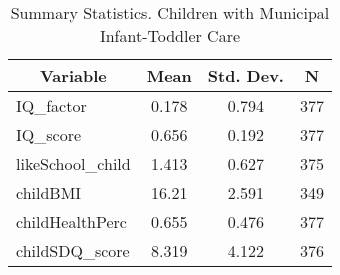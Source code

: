 
\begin{table}[htbp]\centering \caption{Summary Statistics. Children with Municipal Infant-Toddler Care \label{schoolChildasiloMuni}}
\begin{tabular}{l c c  c}\hline\hline
\multicolumn{1}{c}{\textbf{Variable}} & \textbf{Mean}
 & \textbf{Std. Dev.} & \textbf{N}\\ \hline
IQ\_factor & 0.178 & 0.794  & 377\\
IQ\_score & 0.656 & 0.192  & 377\\
likeSchool\_child & 1.413 & 0.627  & 375\\
childBMI & 16.21 & 2.591  & 349\\
childHealthPerc & 0.655 & 0.476  & 377\\
childSDQ\_score & 8.319 & 4.122  & 376\\
\hline\end{tabular}
\end{table}
